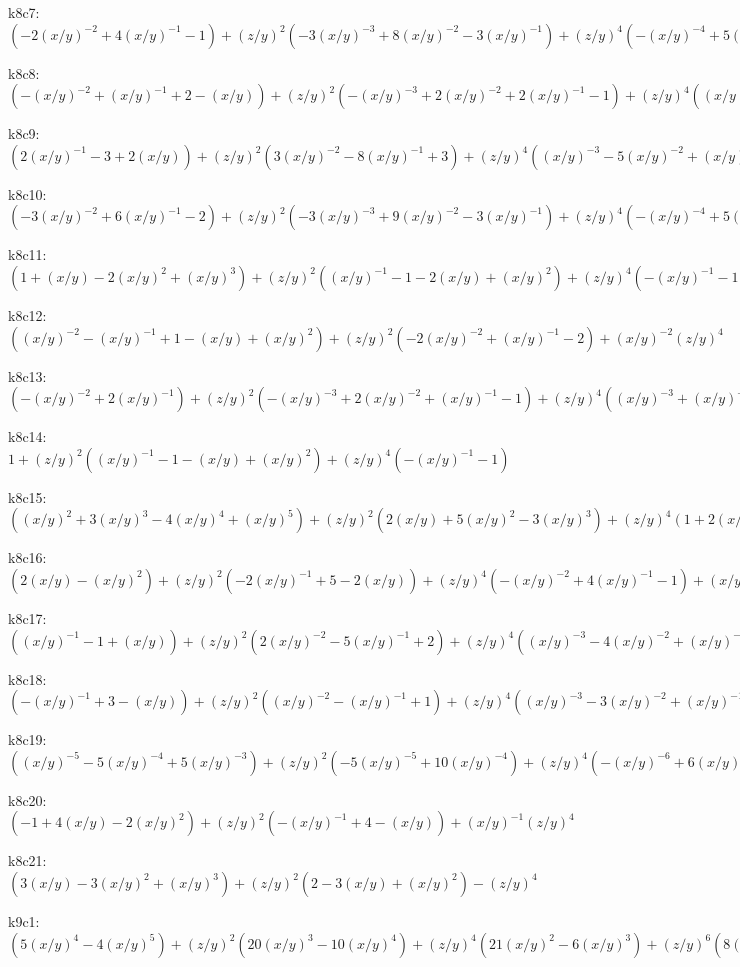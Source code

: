 k8c7: $ (-2(x/y)^{-2}+4(x/y)^{-1}-1)  +(z/y)^{2}(-3(x/y)^{-3}+8(x/y)^{-2}-3(x/y)^{-1})  +(z/y)^{4}(-(x/y)^{-4}+5(x/y)^{-3}-(x/y)^{-2})  +(x/y)^{-4}(z/y)^{6} $ 

k8c8: $ (-(x/y)^{-2}+(x/y)^{-1}+2-(x/y))  +(z/y)^{2}(-(x/y)^{-3}+2(x/y)^{-2}+2(x/y)^{-1}-1)  +(z/y)^{4}((x/y)^{-3}+(x/y)^{-2}) $ 

k8c9: $ (2(x/y)^{-1}-3+2(x/y))  +(z/y)^{2}(3(x/y)^{-2}-8(x/y)^{-1}+3)  +(z/y)^{4}((x/y)^{-3}-5(x/y)^{-2}+(x/y)^{-1})  -(x/y)^{-3}(z/y)^{6} $ 

k8c10: $ (-3(x/y)^{-2}+6(x/y)^{-1}-2)  +(z/y)^{2}(-3(x/y)^{-3}+9(x/y)^{-2}-3(x/y)^{-1})  +(z/y)^{4}(-(x/y)^{-4}+5(x/y)^{-3}-(x/y)^{-2})  +(x/y)^{-4}(z/y)^{6} $ 

k8c11: $ (1+(x/y)-2(x/y)^{2}+(x/y)^{3})  +(z/y)^{2}((x/y)^{-1}-1-2(x/y)+(x/y)^{2})  +(z/y)^{4}(-(x/y)^{-1}-1) $ 

k8c12: $ ((x/y)^{-2}-(x/y)^{-1}+1-(x/y)+(x/y)^{2})  +(z/y)^{2}(-2(x/y)^{-2}+(x/y)^{-1}-2)  +(x/y)^{-2}(z/y)^{4} $ 

k8c13: $ (-(x/y)^{-2}+2(x/y)^{-1})  +(z/y)^{2}(-(x/y)^{-3}+2(x/y)^{-2}+(x/y)^{-1}-1)  +(z/y)^{4}((x/y)^{-3}+(x/y)^{-2}) $ 

k8c14: $ 1  +(z/y)^{2}((x/y)^{-1}-1-(x/y)+(x/y)^{2})  +(z/y)^{4}(-(x/y)^{-1}-1) $ 

k8c15: $ ((x/y)^{2}+3(x/y)^{3}-4(x/y)^{4}+(x/y)^{5})  +(z/y)^{2}(2(x/y)+5(x/y)^{2}-3(x/y)^{3})  +(z/y)^{4}(1+2(x/y)) $ 

k8c16: $ (2(x/y)-(x/y)^{2})  +(z/y)^{2}(-2(x/y)^{-1}+5-2(x/y))  +(z/y)^{4}(-(x/y)^{-2}+4(x/y)^{-1}-1)  +(x/y)^{-2}(z/y)^{6} $ 

k8c17: $ ((x/y)^{-1}-1+(x/y))  +(z/y)^{2}(2(x/y)^{-2}-5(x/y)^{-1}+2)  +(z/y)^{4}((x/y)^{-3}-4(x/y)^{-2}+(x/y)^{-1})  -(x/y)^{-3}(z/y)^{6} $ 

k8c18: $ (-(x/y)^{-1}+3-(x/y))  +(z/y)^{2}((x/y)^{-2}-(x/y)^{-1}+1)  +(z/y)^{4}((x/y)^{-3}-3(x/y)^{-2}+(x/y)^{-1})  -(x/y)^{-3}(z/y)^{6} $ 

k8c19: $ ((x/y)^{-5}-5(x/y)^{-4}+5(x/y)^{-3})  +(z/y)^{2}(-5(x/y)^{-5}+10(x/y)^{-4})  +(z/y)^{4}(-(x/y)^{-6}+6(x/y)^{-5})  +(x/y)^{-6}(z/y)^{6} $ 

k8c20: $ (-1+4(x/y)-2(x/y)^{2})  +(z/y)^{2}(-(x/y)^{-1}+4-(x/y))  +(x/y)^{-1}(z/y)^{4} $ 

k8c21: $ (3(x/y)-3(x/y)^{2}+(x/y)^{3})  +(z/y)^{2}(2-3(x/y)+(x/y)^{2})  -(z/y)^{4} $ 

k9c1: $ (5(x/y)^{4}-4(x/y)^{5})  +(z/y)^{2}(20(x/y)^{3}-10(x/y)^{4})  +(z/y)^{4}(21(x/y)^{2}-6(x/y)^{3})  +(z/y)^{6}(8(x/y)-(x/y)^{2})  +(z/y)^{8} $ 

